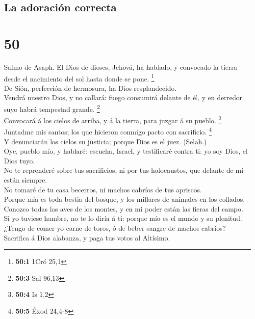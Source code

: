 \hypertarget{la-adoraciuxf3n-correcta}{%
\subsection{La adoración correcta}\label{la-adoraciuxf3n-correcta}}

\hypertarget{section-49}{%
\section{50}\label{section-49}}

 Salmo de Asaph. El Dios de dioses, Jehová, ha hablado, y
convocado la tierra desde el nacimiento del sol hasta donde se pone.
\footnote{\textbf{50:1} 1Cró 25,1}\\
 De Sión, perfección de hermosura, ha Dios
resplandecido.\\
 Vendrá nuestro Dios, y no callará: fuego consumirá
delante de él, y en derredor suyo habrá tempestad grande. \footnote{\textbf{50:3}
  Sal 96,13}\\
 Convocará á los cielos de arriba, y á la tierra, para
juzgar á su pueblo. \footnote{\textbf{50:4} Is 1,2}\\
 Juntadme mis santos; los que hicieron conmigo pacto con
sacrificio. \footnote{\textbf{50:5} Éxod 24,4-8}\\
 Y denunciarán los cielos su justicia; porque Dios es el
juez. (Selah.)\\
 Oye, pueblo mío, y hablaré: escucha, Israel, y
testificaré contra ti: yo soy Dios, el Dios tuyo.\\
 No te reprenderé sobre tus sacrificios, ni por tus
holocaustos, que delante de mí están siempre.\\
 No tomaré de tu casa becerros, ni machos cabríos de tus
apriscos.\\
 Porque mía es toda bestia del bosque, y los millares de
animales en los collados.\\
 Conozco todas las aves de los montes, y en mi poder
están las fieras del campo.\\
 Si yo tuviese hambre, no te lo diría á ti: porque mío es
el mundo y su plenitud.\\
 ¿Tengo de comer yo carne de toros, ó de beber sangre de
machos cabríos?\\
 Sacrifica á Dios alabanza, y paga tus votos al
Altísimo.\\
